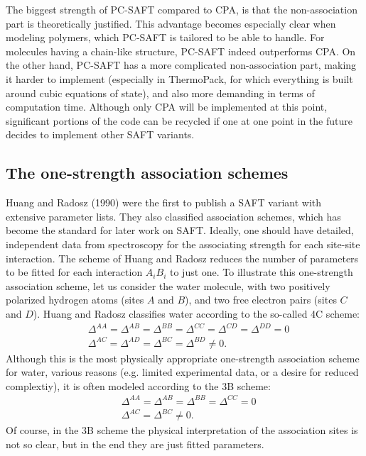 \documentclass[english]{../thermomemo/thermomemo}
\begin{document}
The biggest strength of PC-SAFT compared to CPA, is that the non-association part is theoretically justified. This advantage becomes especially clear when modeling polymers, which PC-SAFT is tailored to be able to handle. For molecules having a chain-like structure, PC-SAFT indeed outperforms CPA. On the other hand, PC-SAFT has a more complicated non-association part, making it harder to implement (especially in ThermoPack, for which everything is built around cubic equations of state), and also more demanding in terms of computation time. Although only CPA will be implemented at this point, significant portions of the code can be recycled if one at one point in the future decides to implement other SAFT variants.

\subsection{The one-strength association schemes}
Huang and Radosz (1990) were the first to publish a SAFT variant with extensive parameter lists. They also classified association schemes, which has become the standard for later work on SAFT. Ideally, one should have detailed, independent data from spectroscopy for the associating strength for each site-site interaction. The scheme of Huang and Radosz reduces the number of parameters to be fitted for each interaction $A_i B_i$ to just one. To illustrate this one-strength association scheme, let us consider the water molecule, with two positively polarized hydrogen atoms (sites $A$ and $B$), and two free electron pairs (sites $C$ and $D$). Huang and Radosz classifies water according to the so-called 4C scheme:
\begin{align*}
&\Delta^{AA} = \Delta^{AB} = \Delta^{BB} = \Delta^{CC} = \Delta^{CD} = \Delta^{DD} = 0 \\
&\Delta^{AC} = \Delta^{AD} = \Delta^{BC} = \Delta^{BD} \neq 0.
\end{align*}
Although this is the most physically appropriate one-strength association scheme for water, various reasons (e.g. limited experimental data, or a desire for reduced complextiy), it is often modeled according to the 3B scheme:
\begin{align*}
&\Delta^{AA} = \Delta^{AB} = \Delta^{BB} = \Delta^{CC} = 0 \\
&\Delta^{AC} = \Delta^{BC} \neq 0.
\end{align*}
Of course, in the 3B scheme the physical interpretation of the association sites is not so clear, but in the end they are just fitted parameters.
\end{document}
